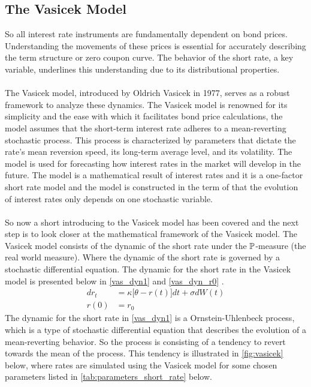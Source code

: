 \subsection{The Vasicek Model}
So all interest rate instruments are fundamentally dependent on bond prices. Understanding the movements of 
these prices is essential for accurately describing the term structure or zero coupon curve. The behavior 
of the short rate, a key variable, underlines this understanding due to its distributional properties.
\\\\
The Vasicek model, introduced by Oldrich Vasicek in 1977, serves as a robust framework to analyze these dynamics.
The Vasicek model is renowned for its simplicity and the ease with which it facilitates bond price calculations, 
the model assumes that the short-term interest rate adheres to a mean-reverting stochastic process. This process is characterized 
by parameters that dictate the rate's mean reversion speed, its long-term average level, and its volatility.
The model is used for forecasting how interest rates in the market will develop in the future. The model is a
mathematical result of interest rates and it is a one-factor short rate model and the model is constructed in the 
term of that the evolution of interest rates only depends on one stochastic variable.
\\\\
So now a short introducing to the Vasicek model has been covered and the next step is to look closer at the 
mathematical framework of the Vasicek model. The Vasicek model consists of the dynamic of the short rate under the $\mathbb{P}$-measure
(the real world measure). Where the dynamic of the short rate is governed by a stochastic differential equation. 
The dynamic for the short rate in the Vasicek model is presented below in \autoref{vas_dyn1} and \autoref{vas_dyn_r0} \cite{Bjork}.
\begin{align}
    d r_t &= \kappa \Big[\theta -r(t)\Big] dt + \sigma d W(t) \label{vas_dyn1}\\
    r(0) &= r_0 \label{vas_dyn_r0}
\end{align}
The dynamic for the short rate in \autoref{vas_dyn1} is a Ornstein-Uhlenbeck process, which is a type of stochastic 
differential equation that describes the evolution of a mean-reverting behavior. So the process is consisting of a 
tendency to revert towards the mean of the process. This tendency is illustrated in \autoref{fig:vasicek} below, where 
 rates are simulated using the Vasicek model for some chosen parameters listed in \autoref{tab:parameters_short_rate} below. 
